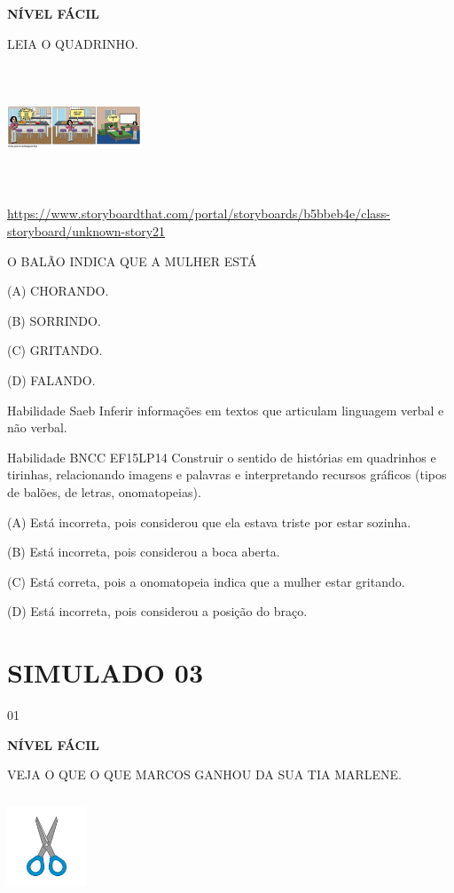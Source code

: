 {{\textbf{NÍVEL FÁCIL}

LEIA O QUADRINHO.

\includegraphics[width=1.57333in,height=1.45456in]{media/image162.png}

\url{https://www.storyboardthat.com/portal/storyboards/b5bbeb4e/class-storyboard/unknown-story21}

O BALÃO INDICA QUE A MULHER ESTÁ

(A) CHORANDO.

(B) SORRINDO.

(C) GRITANDO.

(D) FALANDO.

Habilidade Saeb Inferir informações em textos que articulam linguagem
verbal e não verbal.

Habilidade BNCC EF15LP14 Construir o sentido de histórias em quadrinhos
e tirinhas, relacionando imagens e palavras e interpretando recursos
gráficos (tipos de balões, de letras, onomatopeias).

(A) Está incorreta, pois considerou que ela estava triste por estar
sozinha.

(B) Está incorreta, pois considerou a boca aberta.

(C) Está correta, pois a onomatopeia indica que a mulher estar gritando.

(D) Está incorreta, pois considerou a posição do braço.

\section{SIMULADO 03}

\num{01}

\textbf{NÍVEL FÁCIL}

VEJA O QUE O QUE MARCOS GANHOU DA SUA TIA MARLENE.

\includegraphics[width=0.92708in,height=1.18125in]{media/image163.jpeg}

}}
